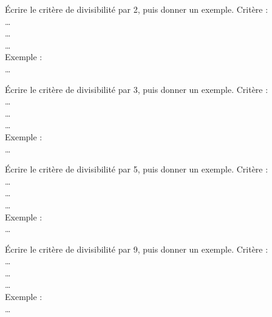 {}
\begin{multicols}{2}
\begin{myenumerate}
    \item \'Ecrire le critère de divisibilité par 2, puis donner un
    exemple.\vskip 0.3cm
    Critère : \dotfill\\
    \ldots \dotfill\\
    \ldots \dotfill\\
    \ldots \dotfill\\
    Exemple : \dotfill\\
    \ldots \dotfill\\
    \item \'Ecrire le critère de divisibilité par 3, puis donner un
    exemple.\vskip 0.3cm
    Critère : \dotfill\\
    \ldots \dotfill\\
    \ldots \dotfill\\
    \ldots \dotfill\\
    Exemple : \dotfill\\
    \ldots \dotfill\\
    \columnbreak
    \item \'Ecrire le critère de divisibilité par 5, puis donner un
    exemple.\vskip 0.3cm
    Critère : \dotfill\\
    \ldots \dotfill\\
    \ldots \dotfill\\
    \ldots \dotfill\\
    Exemple : \dotfill\\
    \ldots \dotfill\\
    \item \'Ecrire le critère de divisibilité par 9, puis donner un
    exemple.\vskip 0.3cm
    Critère : \dotfill\\
    \ldots \dotfill\\
    \ldots \dotfill\\
    \ldots \dotfill\\
    Exemple : \dotfill\\
    \ldots \dotfill\\
\end{myenumerate}
\end{multicols}
